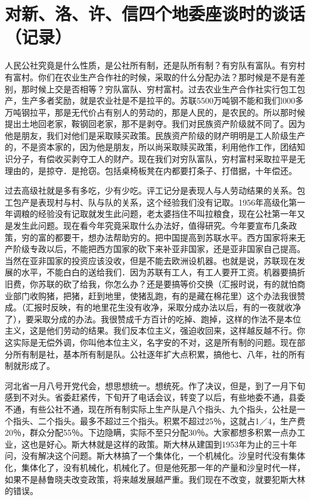 \section[对新、洛、许、信四个地委座谈时的谈话（记录）（一九五九年二月二十一日）]{对新、洛、许、信四个地委座谈时的谈话（记录）}


人民公社究竟是什么性质，是公社所有制，还是队所有制？有穷队有富队。有穷村有富村。你们在农业生产合作社的时候，采取的什么分配办法？那时候是不是有差别，那时候上交是否相等？穷队富队、穷村富村。过去农业生产合作社实行包工包产，生产多者奖励，就是农业社是不是拉平的。苏联5500万吨钢不能和我们l000多万吨钢拉平，那是无代价占有别人的劳动的，那是人民的，是农民的。所以那时候提出土地回老家，鞍钢回老家，那不是剥夺。我们对民族资产阶级就不同了。因为他是朋友，我们对他们是采取赎买政策。民族资产阶级的财产明明是工人阶级生产的，不是资本家的，因为他是朋友，所以尚采取赎买政策，利用他作工作，团结知识分子，有偿收买剥夺工人的财产。现在我们对穷队富队，穷村富村采取拉平是无理由的，是掠夺．是抢窃。包括桌椅板凳在内都要打条子、打借据，十年偿还。

过去高级社就是多有多吃，少有少吃。评工记分是表现人与人劳动结果的关系。包工包产是表现村与村、队与队的关系，这个经验我们没有记取。1956年高级化第一年调粮的经验没有记取就发生此问题，老太婆挡住不叫拉粮食，现在公社第一年又是发生此问题。现在看今年究竟采取什么办法好，值得研究。今年要宣布几条政策，穷的富的都要干，想办法帮助穷的。把中国提高到苏联水平。西方国家将来无产阶级专政以后，不能把西方国家的砍下来补亚非国家，还是亚非国家自己提高。当然在亚非国家的投资应该没收，但是不能去欧洲设机器。也就是说，苏联现在发展的水平，不能白白的送给我们．因为苏联有工人，有工人要开工资。机器要搞折旧费，你苏联的砍了给我，你怎么办？还是要搞等价交换（汇报时说，有的就怕商业部门收购猪，把猪，赶到地里，使猪乱跑，有的是藏在棉花里）这个办法我很赞成。（汇报时反映，有的地里花生没有收净，采取分成办法以后，有的一夜就收净了），要采取分成的办法。我很赞成千方百计的吃掉、跑掉，这样的作法不是本位主义，这是他们劳动的结果。我们反本位主义，强迫收回来，这样越反越不行。你这实际是无偿外调，你叫他本位主义，名字安的不对，这是所有制的问题。现在部分所有制是社，基本所有制是队。公社逐年扩大点积累，搞他七、八年，社的所有制就形成了。

河北省一月八号开党代会，想思想统一。想统死。作了决议，但是，到了一月下旬感到不对头。省委赶紧传，下旬开了电话会议，转变了以后，有些地委不通，县委不通，有些公社不通，现在所有制实际上生产队是八个指头、九个指头，公社是一个指头、二个指头。最多不超过三个指头。积累不超过25％，这就占1／4，生产费20％，群众分配55％。下边隐瞒，实际不至只分配30％。大家都想多积累一点办工业，这也是好心。斯大林就是这样的政策。斯大林从建国到1953年为止的三十年问，没有解决这个问题。斯大林搞了一个集体化，一个机械化。沙皇时代没有集体化，集体化了，没有机械化，机械化了。但是他死那一年的产量和沙皇时代一样，如果不是赫鲁晓夫改变政策，将来越发展越严重。我们现在不改变，就要犯斯大林的错误。

